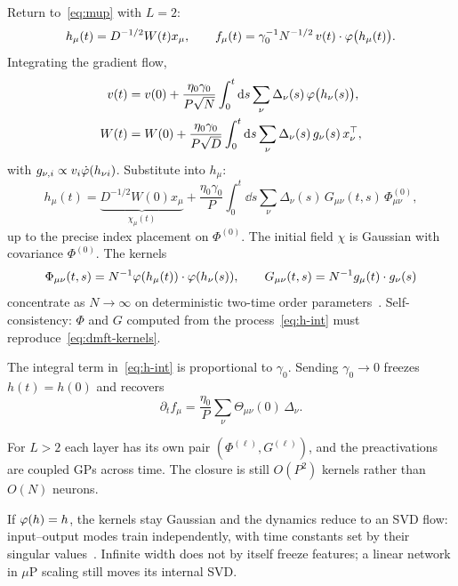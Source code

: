 Return to~\eqref{eq:mup} with $L=2$:
\begin{equation}
  h_\mu(t)=D^{-1/2}W(t)x_\mu,
  \qquad
  f_\mu(t)=\gamma_0^{-1}N^{-1/2}\,v(t)\cdot\varphi\bigl(h_\mu(t)\bigr).
  \label{eq:two-layer}
\end{equation}
Integrating the gradient flow,
\begin{align}
  v(t)&=v(0)+\frac{\eta_0\gamma_0}{P\sqrt{N}}\int_0^t\mathrm{d} s\sum_{\nu}\Delta_\nu(s)\,\varphi\bigl(h_\nu(s)\bigr),
  \label{eq:v-int}\\
  W(t)&=W(0)+\frac{\eta_0\gamma_0}{P\sqrt{D}}\int_0^t\mathrm{d} s\sum_{\nu}\Delta_\nu(s)\,g_\nu(s)\,x_\nu^\top,
  \label{eq:W-int}
\end{align}
with $g_{\nu,i}\propto v_i\dot{\varphi}(h_{\nu i})$. Substitute into $h_\mu$:
\begin{equation}
  h_\mu(t)
  =\underbrace{D^{-1/2}W(0)x_\mu}_{\chi_\mu(t)}
  +\frac{\eta_0\gamma_0}{P}\int_0^t\dd s\sum_{\nu}
  \Delta_\nu(s)\,G_{\mu\nu}(t,s)\,\Phi^{(0)}_{\mu\nu},
  \label{eq:h-int}
\end{equation}
up to the precise index placement on $\Phi^{(0)}$. The initial field $\chi$ is Gaussian with covariance $\Phi^{(0)}$. The kernels
\begin{equation}
  \Phi_{\mu\nu}(t,s)=N^{-1}\varphi(h_\mu(t))\cdot\varphi(h_\nu(s)),
  \qquad
  G_{\mu\nu}(t,s)=N^{-1}g_\mu(t)\cdot g_\nu(s)
  \label{eq:dmft-kernels}
\end{equation}
concentrate as $N\to\infty$ on deterministic two-time order parameters~\cite{pehlevan2023infinite}. Self-consistency: $\Phi$ and $G$ computed from the process~\eqref{eq:h-int} must reproduce~\eqref{eq:dmft-kernels}.

The integral term in~\eqref{eq:h-int} is proportional to $\gamma_0$. Sending $\gamma_0\to 0$ freezes $h(t)=h(0)$ and recovers
\begin{equation}
  \partial_t f_\mu
  =\frac{\eta_0}{P}\sum_{\nu}\Theta_{\mu\nu}(0)\,\Delta_\nu.
  \label{eq:dmft-lazy}
\end{equation}

For $L>2$ each layer has its own pair $(\Phi^{(\ell)},G^{(\ell)})$, and the preactivations are coupled GPs across time. The closure is still $O(P^2)$ kernels rather than $O(N)$ neurons.

If $\varphi(h)=h$, the kernels stay Gaussian and the dynamics reduce to an SVD flow: input--output modes train independently, with time constants set by their singular values~\cite{pehlevan2023infinite}. Infinite width does not by itself freeze features; a linear network in $\mu$P scaling still moves its internal SVD.


